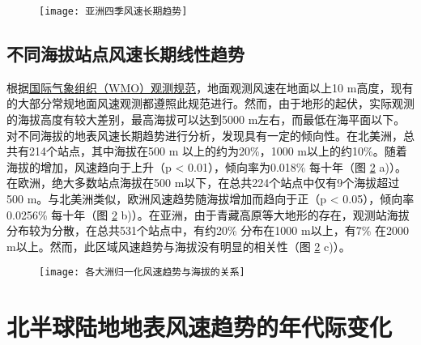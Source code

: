 \begin{figure}[!htbp]
    \centering
    \texttt{[image: 亚洲四季风速长期趋势]}
    \label{fig:ASwindtrend}
\end{figure}

\subsection{不同海拔站点风速长期线性趋势}

根据\href{https://community.wmo.int/activity-areas/imop/cimo-guide/cimo-guide-preliminary-2018-edition}{国际气象组织（WMO）观测规范}，地面观测风速在地面以上10 m高度，现有的大部分常规地面风速观测都遵照此规范进行。然而，由于地形的起伏，实际观测的海拔高度有较大差别，最高海拔可以达到5000 m左右，而最低在海平面以下。对不同海拔的地表风速长期趋势进行分析，发现具有一定的倾向性。在北美洲，总共有214个站点，其中海拔在500 m 以上的约为20\%，1000 m以上的约10\%。随着海拔的增加，风速趋向于上升（p < 0.01），倾向率为0.018\% 每十年（图 \ref{fig:regionalwindvselevation} a)）。在欧洲，绝大多数站点海拔在500 m以下，在总共224个站点中仅有9个海拔超过500 m。与北美洲类似，欧洲风速趋势随海拔增加而趋向于正（p < 0.05），倾向率0.0256\% 每十年（图 \ref{fig:regionalwindvselevation} b)）。在亚洲，由于青藏高原等大地形的存在，观测站海拔分布较为分散，在总共531个站点中，有约20\% 分布在1000 m以上，有7\% 在2000 m以上。然而，此区域风速趋势与海拔没有明显的相关性（图 \ref{fig:regionalwindvselevation} c)）。

\begin{figure}[!htbp]
    \centering
    \texttt{[image: 各大洲归一化风速趋势与海拔的关系]}
    \label{fig:regionalwindvselevation}
\end{figure}

\section{北半球陆地地表风速趋势的年代际变化}

